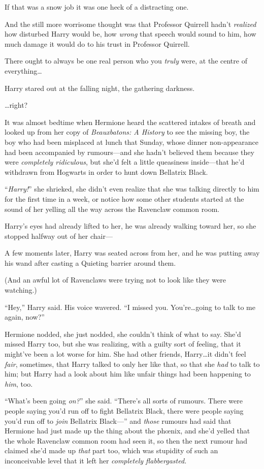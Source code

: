 If that was a snow job it was one heck of a distracting one.

And the still more worrisome thought was that Professor Quirrell hadn’t \emph{realized} how disturbed Harry would be, how \emph{wrong} that speech would sound to him, how much damage it would do to his trust in Professor Quirrell.

There ought to always be one real person who you \emph{truly} were, at the centre of everything…

Harry stared out at the falling night, the gathering darkness.

…right?

\later

It was almost bedtime when Hermione heard the scattered intakes of breath and looked up from her copy of \emph{Beauxbatons: A History} to see the missing boy, the boy who had been misplaced at lunch that Sunday, whose dinner non-appearance had been accompanied by rumours—and she hadn’t believed them because they were \emph{completely ridiculous}, but she’d felt a little queasiness inside—that he’d withdrawn from Hogwarts in order to hunt down Bellatrix Black.

“\emph{Harry!}” she shrieked, she didn’t even realize that she was talking directly to him for the first time in a week, or notice how some other students started at the sound of her yelling all the way across the Ravenclaw common room.

Harry’s eyes had already lifted to her, he was already walking toward her, so she stopped halfway out of her chair—

A few moments later, Harry was seated across from her, and he was putting away his wand after casting a Quieting barrier around them.

(And an awful lot of Ravenclaws were trying not to look like they were watching.)

“Hey,” Harry said. His voice wavered. “I missed you. You’re…going to talk to me again, now?”

Hermione nodded, she just nodded, she couldn’t think of what to say. She’d missed Harry too, but she was realizing, with a guilty sort of feeling, that it might’ve been a lot worse for him. She had other friends, Harry…it didn’t feel \emph{fair}, sometimes, that Harry talked to only her like that, so that she \emph{had} to talk to him; but Harry had a look about him like unfair things had been happening to \emph{him}, too.

“What’s been going \emph{on?}” she said. “There’s all sorts of rumours. There were people saying you’d run off to fight Bellatrix Black, there were people saying you’d run off to \emph{join} Bellatrix Black—” and \emph{those} rumours had said that Hermione had just made up the thing about the phœnix, and she’d yelled that the whole Ravenclaw common room had seen it, so then the next rumour had claimed she’d made up \emph{that} part too, which was stupidity of such an inconceivable level that it left her \emph{completely flabbergasted.}

